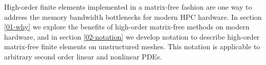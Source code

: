 High-order finite elements implemented in a matrix-free fashion are one way to address the memory bandwidth bottlenecks for modern HPC hardware.
In section \ref{01-why} we explore the benefits of high-order matrix-free methods on modern hardware, and in section \ref{02-notation} we develop notation to describe high-order matrix-free finite elements on unstructured meshes.
This notation is applicable to arbitrary second order linear and nonlinear PDEs.
